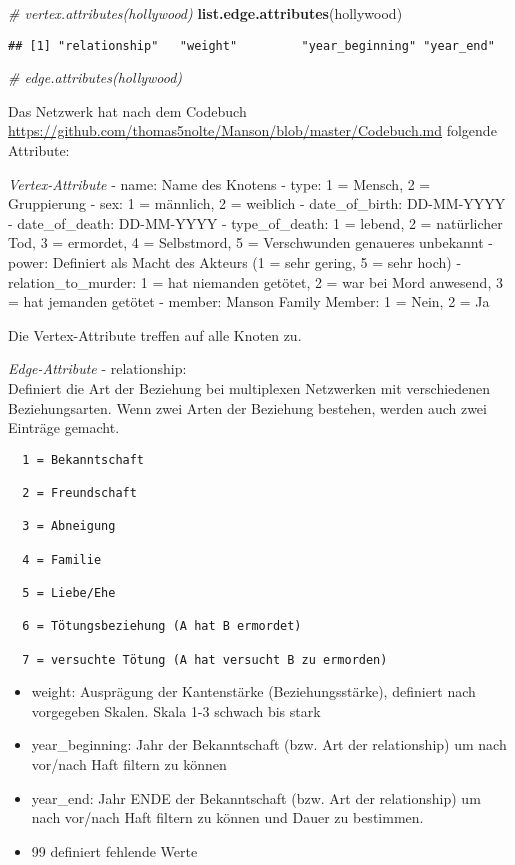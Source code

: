 \documentclass[
]{article}
\newenvironment{Shaded}{\begin{snugshade}}{\end{snugshade}}
\newcommand{\CommentTok}[1]{\textcolor[rgb]{0.56,0.35,0.01}{\textit{#1}}}
\newcommand{\KeywordTok}[1]{\textcolor[rgb]{0.13,0.29,0.53}{\textbf{#1}}}
\newcommand{\NormalTok}[1]{#1}
\begin{document}
\begin{Shaded}
\begin{Highlighting}[]
\CommentTok{# vertex.attributes(hollywood)}
\KeywordTok{list.edge.attributes}\NormalTok{(hollywood)}
\end{Highlighting}
\end{Shaded}

\begin{verbatim}
## [1] "relationship"   "weight"         "year_beginning" "year_end"
\end{verbatim}

\begin{Shaded}
\begin{Highlighting}[]
\CommentTok{# edge.attributes(hollywood)}
\end{Highlighting}
\end{Shaded}

Das Netzwerk hat nach dem Codebuch
\url{https://github.com/thomas5nolte/Manson/blob/master/Codebuch.md}
folgende Attribute:

\emph{Vertex-Attribute} - name: Name des Knotens - type: 1 = Mensch, 2 =
Gruppierung - sex: 1 = männlich, 2 = weiblich - date\_of\_birth:
DD-MM-YYYY - date\_of\_death: DD-MM-YYYY - type\_of\_death: 1 = lebend,
2 = natürlicher Tod, 3 = ermordet, 4 = Selbstmord, 5 = Verschwunden
genaueres unbekannt - power: Definiert als Macht des Akteurs (1 = sehr
gering, 5 = sehr hoch) - relation\_to\_murder: 1 = hat niemanden
getötet, 2 = war bei Mord anwesend, 3 = hat jemanden getötet - member:
Manson Family Member: 1 = Nein, 2 = Ja

Die Vertex-Attribute treffen auf alle Knoten zu.

\emph{Edge-Attribute} - relationship:\\
Definiert die Art der Beziehung bei multiplexen Netzwerken mit
verschiedenen Beziehungsarten. Wenn zwei Arten der Beziehung bestehen,
werden auch zwei Einträge gemacht.

\begin{verbatim}
  1 = Bekanntschaft

  2 = Freundschaft

  3 = Abneigung

  4 = Familie

  5 = Liebe/Ehe

  6 = Tötungsbeziehung (A hat B ermordet)

  7 = versuchte Tötung (A hat versucht B zu ermorden)
\end{verbatim}

\begin{itemize}
\item
  weight: Ausprägung der Kantenstärke (Beziehungsstärke), definiert nach
  vorgegeben Skalen. Skala 1-3 schwach bis stark
\item
  year\_beginning: Jahr der Bekanntschaft (bzw. Art der relationship) um
  nach vor/nach Haft filtern zu können
\item
  year\_end: Jahr ENDE der Bekanntschaft (bzw. Art der relationship) um
  nach vor/nach Haft filtern zu können und Dauer zu bestimmen.
\item
  99 definiert fehlende Werte
\end{itemize}
\end{document}
